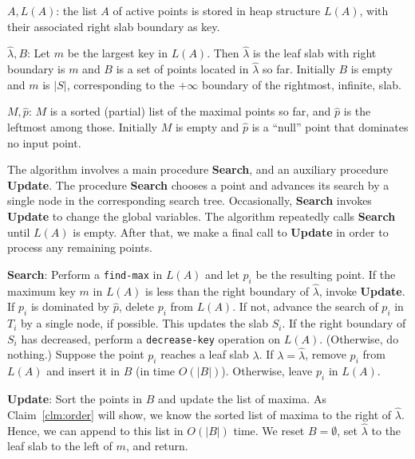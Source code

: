 \documentclass[letterpaper,11pt]{article}
\newcommand{\wlambda}{\widehat{\lambda}}
\newcommand{\findmax}{\texttt{find-max}}
\newcommand{\deckey}{\texttt{decrease-key}}
\begin{document}
\begin{asparaenum}
  \item $A, L(A)$: the list $A$ of 
    active points is stored in 
    heap structure $L(A)$, with
    their associated right slab boundary as key.
  \item $\wlambda, B$: Let $m$ be the largest 
     key in $L(A)$. Then $\wlambda$ is the leaf slab 
     with right boundary is $m$ and
     $B$ is a set of points located in $\wlambda$
     so far. Initially $B$ is empty and $m$ is $|S|$, 
     corresponding to the $+\infty$ boundary of the 
     rightmost, infinite, slab.
  \item $M, \hat{p}$: $M$ is a sorted (partial) list 
    of the maximal points so far,
    and $\hat{p}$ is the leftmost among those. 
    Initially $M$ is empty and $\hat{p}$ is a 
    ``null'' point that dominates no input point.
\end{asparaenum}

The algorithm involves a main 
procedure \textbf{Search}, and an 
auxiliary procedure
\textbf{Update}. The procedure \textbf{Search} 
chooses a point and advances
its search by a single node in the corresponding
search tree. Occasionally, \textbf{Search} invokes 
\textbf{Update} to change the global variables. 
The algorithm repeatedly calls \textbf{Search}
until $L(A)$ is empty. 
After that, we make a final call to 
\textbf{Update} in order to
process any remaining points.

\noindent
\textbf{Search}:  
Perform a \findmax{} in $L(A)$
and let $p_i$ be the resulting
point.
If the maximum key $m$ in $L(A)$ is 
less than the right 
boundary of $\widehat{\lambda}$, 
invoke \textbf{Update}. 
If $p_i$ is dominated by $\hat{p}$, 
delete $p_i$ from $L(A)$.
If not, advance 
the search of $p_i$ in $T_i$ by 
a single node, if possible. 
This updates the slab $S_i$. If 
the right boundary of $S_i$ has 
decreased, perform a 
\deckey{} operation on $L(A)$. 
(Otherwise, do nothing.)
Suppose the point $p_i$ reaches 
a leaf slab $\lambda$.  If 
$\lambda = \widehat{\lambda}$, 
remove $p_i$ from $L(A)$ and insert it
in $B$ (in time $O(|B|)$). Otherwise, 
leave $p_i$ in $L(A)$.

	
\noindent
\textbf{Update}: 
Sort the points in $B$ and update 
the list of maxima.
As Claim~\ref{clm:order} will show, we 
know the sorted list of maxima to 
the right of $\wlambda$.  Hence, 
we can append to this list in $O(|B|)$
time. We reset $B = \emptyset$,
set $\widehat{\lambda}$ to the leaf 
slab to the left of $m$, and return.
\end{document}
